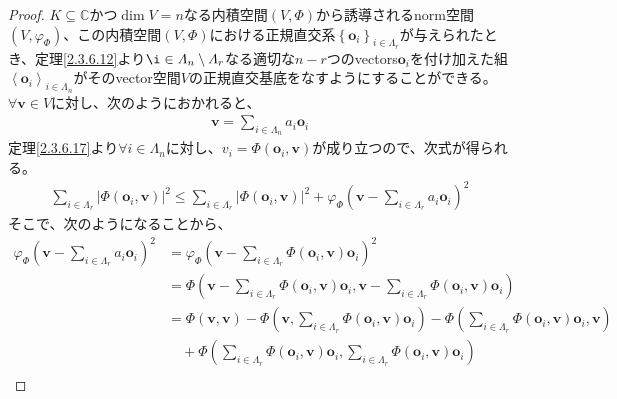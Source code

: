 \documentclass[dvipdfmx]{jsarticle}
\begin{document}
\begin{proof}
$K \subseteq \mathbb{C}$かつ$\dim V = n$なる内積空間$(V,\varPhi )$から誘導されるnorm空間$\left( V,\varphi_{\varPhi } \right)$、この内積空間$(V,\varPhi )$における正規直交系$\left\{ \mathbf{o}_{i} \right\}_{i \in \varLambda_{r}}$が与えられたとき、定理\ref{2.3.6.12}より$\i \in \varLambda_{n} \setminus \varLambda_{r}$なる適切な$n - r$つのvectors$\mathbf{o}_{i}$を付け加えた組$\left\langle \mathbf{o}_{i} \right\rangle_{i \in \varLambda_{n}}$がそのvector空間$V$の正規直交基底をなすようにすることができる。$\forall\mathbf{v} \in V$に対し、次のようにおかれると、
\begin{align*}
\mathbf{v} = \sum_{i \in \varLambda_{n}} {a_{i}\mathbf{o}_{i}}
\end{align*}
定理\ref{2.3.6.17}より$\forall i \in \varLambda_{n}$に対し、$v_{i} = \varPhi \left( \mathbf{o}_{i},\mathbf{v} \right)$が成り立つので、次式が得られる。
\begin{align*}
\sum_{i \in \varLambda_{r}} \left| \varPhi \left( \mathbf{o}_{i},\mathbf{v} \right) \right|^{2} \leq \sum_{i \in \varLambda_{r}} \left| \varPhi \left( \mathbf{o}_{i},\mathbf{v} \right) \right|^{2} + {\varphi_{\varPhi }\left( \mathbf{v} - \sum_{i \in \varLambda_{r}} {a_{i}\mathbf{o}_{i}} \right)}^{2}
\end{align*}
そこで、次のようになることから、
\begin{align*}
{\varphi_{\varPhi }\left( \mathbf{v} - \sum_{i \in \varLambda_{r}} {a_{i}\mathbf{o}_{i}} \right)}^{2} &= {\varphi_{\varPhi }\left( \mathbf{v} - \sum_{i \in \varLambda_{r}} {\varPhi \left( \mathbf{o}_{i},\mathbf{v} \right)\mathbf{o}_{i}} \right)}^{2}\\
&= \varPhi \left( \mathbf{v} - \sum_{i \in \varLambda_{r}} {\varPhi \left( \mathbf{o}_{i},\mathbf{v} \right)\mathbf{o}_{i}},\mathbf{v} - \sum_{i \in \varLambda_{r}} {\varPhi \left( \mathbf{o}_{i},\mathbf{v} \right)\mathbf{o}_{i}} \right)\\
&= \varPhi \left( \mathbf{v,v} \right) - \varPhi \left( \mathbf{v},\sum_{i \in \varLambda_{r}} {\varPhi \left( \mathbf{o}_{i},\mathbf{v} \right)\mathbf{o}_{i}} \right) - \varPhi \left( \sum_{i \in \varLambda_{r}} {\varPhi \left( \mathbf{o}_{i},\mathbf{v} \right)\mathbf{o}_{i}},\mathbf{v} \right) \\
&\quad + \varPhi \left( \sum_{i \in \varLambda_{r}} {\varPhi \left( \mathbf{o}_{i},\mathbf{v} \right)\mathbf{o}_{i}},\sum_{i \in \varLambda_{r}} {\varPhi \left( \mathbf{o}_{i},\mathbf{v} \right)\mathbf{o}_{i}} \right)\\

\end{align*}
\end{proof}
\end{document}
